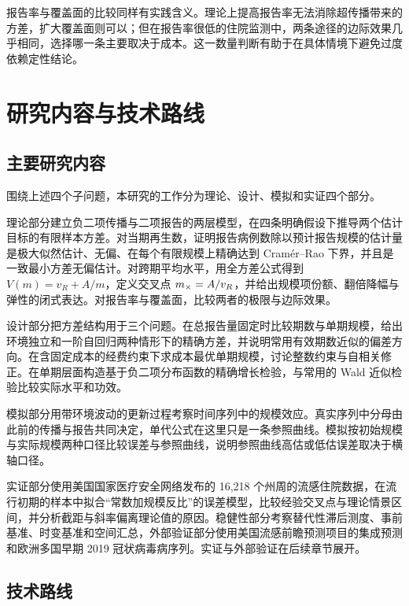 报告率与覆盖面的比较同样有实践含义。理论上提高报告率无法消除超传播带来的方差，扩大覆盖面则可以；但在报告率很低的住院监测中，两条途径的边际效果几乎相同，选择哪一条主要取决于成本。这一数量判断有助于在具体情境下避免过度依赖定性结论。

\section{研究内容与技术路线}
\label{sec:intro-content}

\subsection{主要研究内容}

围绕上述四个子问题，本研究的工作分为理论、设计、模拟和实证四个部分。

理论部分建立负二项传播与二项报告的两层模型，在四条明确假设下推导两个估计目标的有限样本方差。对当期再生数，证明报告病例数除以预计报告规模的估计量是极大似然估计、无偏、在每个有限规模上精确达到 Cramér--Rao 下界，并且是一致最小方差无偏估计。对跨期平均水平，用全方差公式得到 $V(m)=v_R+A/m$，定义交叉点 $m_{\times}=A/v_R$，并给出规模项份额、翻倍降幅与弹性的闭式表达。对报告率与覆盖面，比较两者的极限与边际效果。

设计部分把方差结构用于三个问题。在总报告量固定时比较期数与单期规模，给出环境独立和一阶自回归两种情形下的精确方差，并说明常用有效期数近似的偏差方向。在含固定成本的经费约束下求成本最优单期规模，讨论整数约束与自相关修正。在单期层面构造基于负二项分布函数的精确增长检验，与常用的 Wald 近似检验比较实际水平和功效。

模拟部分用带环境波动的更新过程考察时间序列中的规模效应。真实序列中分母由此前的传播与报告共同决定，单代公式在这里只是一条参照曲线。模拟按初始规模与实际规模两种口径比较误差与参照曲线，说明参照曲线高估或低估误差取决于横轴口径。

实证部分使用美国国家医疗安全网络发布的 16,218 个州周的流感住院数据\citep{cdc2026nhsn}，在流行初期的样本中拟合“常数加规模反比”的误差模型，比较经验交叉点与理论情景区间，并分析截距与斜率偏离理论值的原因。稳健性部分考察替代性滞后测度、事前基准、时变基准和空间汇总，外部验证部分使用美国流感前瞻预测项目的集成预测\citep{mathis2024evaluation}和欧洲多国早期 2019 冠状病毒病序列\citep{flaxman2020estimating}。实证与外部验证在后续章节展开。

\subsection{技术路线}

